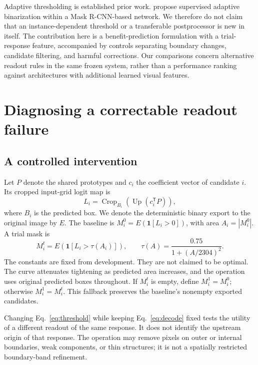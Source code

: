 \documentclass[times,twocolumn,final,authoryear]{elsarticle}
\begin{document}
Adaptive thresholding is established prior work. \citet{liu2021adaptive} propose supervised adaptive binarization within a Mask R-CNN-based network. We therefore do not claim that an instance-dependent threshold or a transferable postprocessor is new in itself. The contribution here is a benefit-prediction formulation with a trial-response feature, accompanied by controls separating boundary changes, candidate filtering, and harmful corrections. Our comparisons concern alternative readout rules in the same frozen system, rather than a performance ranking against architectures with additional learned visual features.

\section{Diagnosing a correctable readout failure}
\subsection{A controlled intervention}
Let $P$ denote the shared prototypes and $c_i$ the coefficient vector of candidate $i$. Its cropped input-grid logit map is
\begin{equation}
 L_i=\operatorname{Crop}_{B_i}\!\left(\operatorname{Up}(c_i^{\mathsf T}P)\right),
 \label{eq:decode}
\end{equation}
where $B_i$ is the predicted box. We denote the deterministic binary export to the original image by $E$. The baseline is $M_i^0=E(\mathbf{1}[L_i>0])$, with area $A_i=|M_i^0|$. A trial mask is
\begin{equation}
 M_i^t=E(\mathbf{1}[L_i>\tau(A_i)]),\qquad
 \tau(A)=\frac{0.75}{1+(A/2304)^2}.
 \label{eq:threshold}
\end{equation}
The constants are fixed from development. They are not claimed to be optimal. The curve attenuates tightening as predicted area increases, and the operation uses original predicted boxes throughout. If $M_i^t$ is empty, define $M_i^1=M_i^0$; otherwise $M_i^1=M_i^t$. This fallback preserves the baseline's nonempty exported candidates.

Changing Eq.~\ref{eq:threshold} while keeping Eq.~\ref{eq:decode} fixed tests the utility of a different readout of the same response. It does not identify the upstream origin of that response. The operation may remove pixels on outer or internal boundaries, weak components, or thin structures; it is not a spatially restricted boundary-band refinement.
\end{document}
